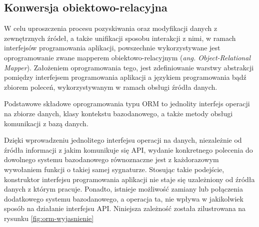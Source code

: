 \subsection*{Konwersja obiektowo-relacyjna}
W celu uproszczenia procesu pozyskiwania oraz modyfikacji danych z zewnętrznych źródeł, a także unifikacji sposobu interakcji z nimi, w ramach interfejsów programowania aplikacji, powszechnie wykorzystywane jest oprogramowanie zwane mapperem obiektowo-relacyjnym (\textit{ang. Object-Relational Mapper}). Założeniem oprogramowania tego, jest zdefiniowanie warstwy abstrakcji pomiędzy interfejsem programowania aplikacji a językiem programowania bądź zbiorem poleceń, wykorzystywanym w ramach obsługi źródła danych.

Podstawowe składowe oprogramowania typu ORM to jednolity interfejs operacji na zbiorze danych, klasy kontekstu bazodanowego, a także metody obsługi komunikacji z bazą danych.

Dzięki wprowadzeniu jednolitego interfejsu operacji na danych, niezależnie od źródła informacji z jakim komunikuje się API, wydanie konkretnego polecenia do dowolnego systemu bazodanowego równoznaczne jest z każdorazowym wywołaniem funkcji o takiej samej sygnaturze. Stosując takie podejście, konstruktor interfejsu programowania aplikacji nie staje się uzależniony od źródła danych z którym pracuje. Ponadto, istnieje możliwość zamiany lub połączenia dodatkowego systemu bazodanowego, a operacja ta, nie wpływa w jakikolwiek sposób na działanie interfejsu API. Niniejsza zależność została zilustrowana na rysunku \ref{fig:orm-wyjasnienie}

